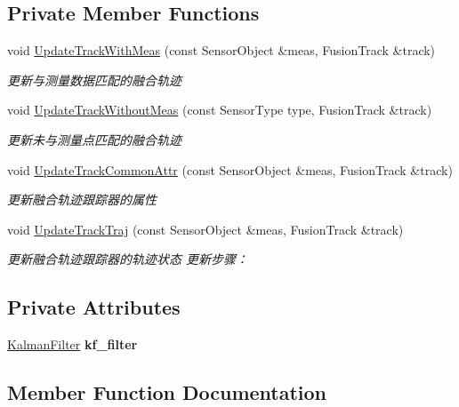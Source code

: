 \subsection*{Private Member Functions}
\begin{DoxyCompactItemize}
\item 
void \hyperlink{classTrackUpdater_aa87416c54850c730536091a6a8436a9e}{Update\+Track\+With\+Meas} (const Sensor\+Object \&meas, Fusion\+Track \&track)
\begin{DoxyCompactList}\small\item\em 更新与测量数据匹配的融合轨迹 \end{DoxyCompactList}\item 
void \hyperlink{classTrackUpdater_a6ab3af29b364ede418503a23e125cbbf}{Update\+Track\+Without\+Meas} (const Sensor\+Type type, Fusion\+Track \&track)
\begin{DoxyCompactList}\small\item\em 更新未与测量点匹配的融合轨迹 \end{DoxyCompactList}\item 
void \hyperlink{classTrackUpdater_ae14cb6ffde06a9b60722aac04ccf2b56}{Update\+Track\+Common\+Attr} (const Sensor\+Object \&meas, Fusion\+Track \&track)
\begin{DoxyCompactList}\small\item\em 更新融合轨迹跟踪器的属性 \end{DoxyCompactList}\item 
void \hyperlink{classTrackUpdater_a1113a816e4e495cd93f86d20183689c9}{Update\+Track\+Traj} (const Sensor\+Object \&meas, Fusion\+Track \&track)
\begin{DoxyCompactList}\small\item\em 更新融合轨迹跟踪器的轨迹状态 更新步骤： \end{DoxyCompactList}\end{DoxyCompactItemize}
\subsection*{Private Attributes}
\begin{DoxyCompactItemize}
\item 
\mbox{\label{classTrackUpdater_a21322182496ef9a411e51efdf7f8a839}} 
\hyperlink{classKalmanFilter}{Kalman\+Filter} {\bfseries kf\+\_\+filter}
\end{DoxyCompactItemize}


\subsection{Member Function Documentation}
\mbox{\label{classTrackUpdater_a30026dd9e3cb157952dd5e373d4dc2f2}} 
